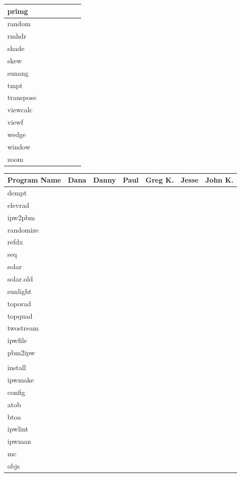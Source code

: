 \begin{tabular}{||l|l|l|l|l|l|l||}
primg & & & & & & \\ \hline
random & & & & & & \\ \hline
rmhdr & & & & & & \\ \hline
shade & & & & & & \\ \hline
skew & & & & & & \\ \hline
sunang & & & & & & \\ \hline
tmpt & & & & & & \\ \hline
transpose & & & & & & \\ \hline
viewcalc & & & & & & \\ \hline
viewf & & & & & & \\ \hline
wedge & & & & & & \\ \hline
window & & & & & & \\ \hline
zoom & & & & & & \\ \hline
\end{tabular}

\begin{tabular}{||l|l|l|l|l|l|l||} \hline
Program Name & Dana & Danny & Paul & Greg K. & Jesse & John K. \\ \hline\hline
dempt & & & & & & \\ \hline
elevrad & & & & & & \\ \hline
ipw2pbm & & & & & & \\ \hline
randomize & & & & & & \\ \hline
refdx & & & & & & \\ \hline
seq & & & & & & \\ \hline
solar & & & & & & \\ \hline
solar.old & & & & & & \\ \hline
sunlight & & & & & & \\ \hline
toporad & & & & & & \\ \hline
topquad & & & & & & \\ \hline
twostream & & & & & & \\ \hline
ipwfile & & & & & & \\ \hline
pbm2ipw & & & & & & \\ \hline
 & & & & & & \\ \hline
install & & & & & & \\ \hline
ipwmake & & & & & & \\ \hline
config & & & & & & \\ \hline
atob & & & & & & \\ \hline
btoa & & & & & & \\ \hline
ipwlint & & & & & & \\ \hline
ipwman & & & & & & \\ \hline
mc & & & & & & \\ \hline
objs & & & & & & \\ \hline
\end{tabular}

